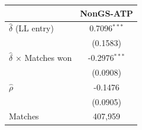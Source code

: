 \begin{tabular}{lc}
\toprule
 & NonGS-ATP \\
\midrule
$\hat{\delta}$ (LL entry) & 0.7096$^{***}$ \\
 & (0.1583) \\
$\hat{\delta}$ $\times$ Matches won & -0.2976$^{***}$ \\
 & (0.0908) \\
$\hat{\rho}$ & -0.1476 \\
 & (0.0905) \\
\midrule
Matches & 407,959 \\
\bottomrule
\end{tabular}
